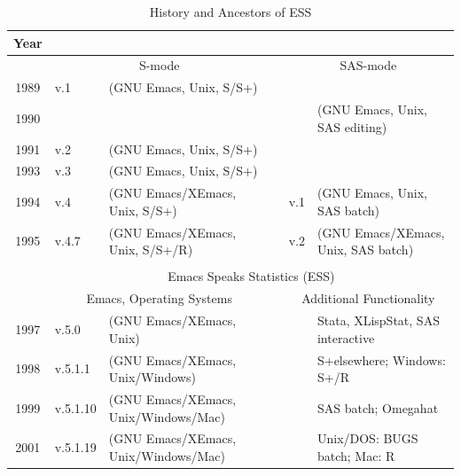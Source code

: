 \documentclass{article}
\begin{document}
\begin{table}[tbp]
  \centering
  {\scriptsize
  \begin{tabular}{c ll c ll}
\hline
    Year  \\ 
\hline
         & \multicolumn{2}{c}{S-mode}       && \multicolumn{2}{c}{SAS-mode} \\ 
\cline{2-3} \cline{5-6}
    1989 & v.1 & (GNU Emacs, Unix, S/S+)        &&  \\
    1990 &     &                            &&     & (GNU Emacs, Unix, SAS editing) \\
    1991 & v.2 & (GNU Emacs, Unix, S/S+)        && \\
    1993 & v.3 & (GNU Emacs, Unix, S/S+)        && \\
    1994 & v.4 & (GNU Emacs/XEmacs, Unix, S/S+) && v.1  & (GNU Emacs, Unix, SAS batch) \\
    1995 & v.4.7 & (GNU Emacs/XEmacs, Unix, S/S+/R) && v.2 & (GNU Emacs/XEmacs, Unix, SAS batch) \\
    \cline{2-6}\\[-3.5ex]
    \cline{2-6}
         & \multicolumn{5}{c}{Emacs Speaks Statistics (ESS)} \\
    \cline{2-6} 
         &\multicolumn{2}{c}{Emacs, Operating Systems} &&\multicolumn{2}{c}{Additional Functionality}\\
\cline{2-3} \cline{5-6}
    1997 & v.5.0 & (GNU Emacs/XEmacs, Unix)         &&&  Stata, XLispStat, SAS interactive \\
    1998 & v.5.1.1 & (GNU Emacs/XEmacs, Unix/Windows) &&&  S+elsewhere; Windows: S+/R\\
    1999 & v.5.1.10 & (GNU Emacs/XEmacs, Unix/Windows/Mac) &&& SAS batch; Omegahat \\
    2001 & v.5.1.19 & (GNU Emacs/XEmacs, Unix/Windows/Mac) &&& Unix/DOS: BUGS batch; Mac: R \\
    \hline
  \end{tabular}
  }
  \caption{History and Ancestors of ESS}
  \label{tab:timeline}
\end{table}


\end{document}
